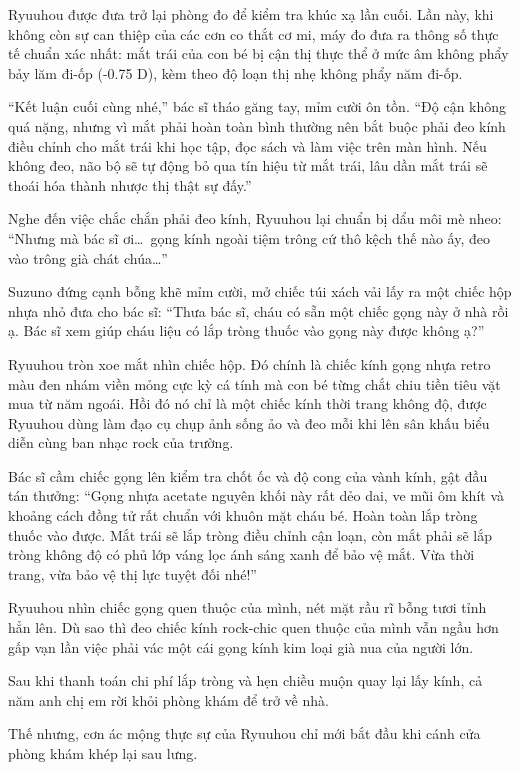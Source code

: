 ﻿\documentclass[../main.tex]{subfiles}
\begin{document}
Ryuuhou được đưa trở lại phòng đo để kiểm tra khúc xạ lần cuối. Lần này, khi không còn sự can thiệp của các cơn co thắt cơ mi, máy đo đưa ra thông số thực tế chuẩn xác nhất: mắt trái của con bé bị cận thị thực thể ở mức âm không phẩy bảy lăm đi-ốp (-0.75 D), kèm theo độ loạn thị nhẹ không phẩy năm đi-ốp.

``Kết luận cuối cùng nhé,'' bác sĩ tháo găng tay, mỉm cười ôn tồn. ``Độ cận không quá nặng, nhưng vì mắt phải hoàn toàn bình thường nên bắt buộc phải đeo kính điều chỉnh cho mắt trái khi học tập, đọc sách và làm việc trên màn hình. Nếu không đeo, não bộ sẽ tự động bỏ qua tín hiệu từ mắt trái, lâu dần mắt trái sẽ thoái hóa thành nhược thị thật sự đấy.''

Nghe đến việc chắc chắn phải đeo kính, Ryuuhou lại chuẩn bị dẩu môi mè nheo: ``Nhưng mà bác sĩ ơi\dots\ gọng kính ngoài tiệm trông cứ thô kệch thế nào ấy, đeo vào trông già chát chúa\dots''

Suzuno đứng cạnh bỗng khẽ mỉm cười, mở chiếc túi xách vải lấy ra một chiếc hộp nhựa nhỏ đưa cho bác sĩ: ``Thưa bác sĩ, cháu có sẵn một chiếc gọng này ở nhà rồi ạ. Bác sĩ xem giúp cháu liệu có lắp tròng thuốc vào gọng này được không ạ?''

Ryuuhou tròn xoe mắt nhìn chiếc hộp. Đó chính là chiếc kính gọng nhựa retro màu đen nhám viền mỏng cực kỳ cá tính mà con bé từng chắt chiu tiền tiêu vặt mua từ năm ngoái. Hồi đó nó chỉ là một chiếc kính thời trang không độ, được Ryuuhou dùng làm đạo cụ chụp ảnh sống ảo và đeo mỗi khi lên sân khấu biểu diễn cùng ban nhạc rock của trường.

Bác sĩ cầm chiếc gọng lên kiểm tra chốt ốc và độ cong của vành kính, gật đầu tán thưởng: ``Gọng nhựa acetate nguyên khối này rất dẻo dai, ve mũi ôm khít và khoảng cách đồng tử rất chuẩn với khuôn mặt cháu bé. Hoàn toàn lắp tròng thuốc vào được. Mắt trái sẽ lắp tròng điều chỉnh cận loạn, còn mắt phải sẽ lắp tròng không độ có phủ lớp váng lọc ánh sáng xanh để bảo vệ mắt. Vừa thời trang, vừa bảo vệ thị lực tuyệt đối nhé!''

Ryuuhou nhìn chiếc gọng quen thuộc của mình, nét mặt rầu rĩ bỗng tươi tỉnh hẳn lên. Dù sao thì đeo chiếc kính rock-chic quen thuộc của mình vẫn ngầu hơn gấp vạn lần việc phải vác một cái gọng kính kim loại già nua của người lớn.

Sau khi thanh toán chi phí lắp tròng và hẹn chiều muộn quay lại lấy kính, cả năm anh chị em rời khỏi phòng khám để trở về nhà.

\ct

Thế nhưng, cơn ác mộng thực sự của Ryuuhou chỉ mới bắt đầu khi cánh cửa phòng khám khép lại sau lưng.
\end{document}
